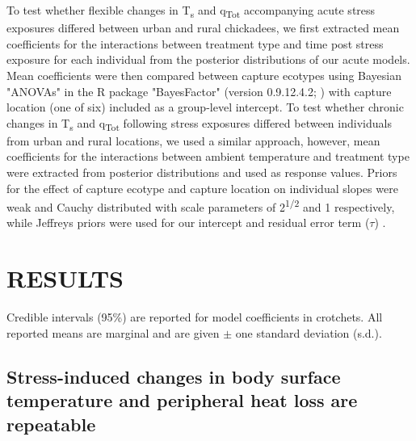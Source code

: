 \documentclass[12pt]{article}
\begin{document}
\noindent To test whether flexible changes in T\textsubscript{s} and q\textsubscript{Tot} accompanying acute stress exposures differed between urban and rural chickadees, we first extracted mean coefficients for the interactions between treatment type and time post stress exposure for each individual from the posterior distributions of our acute models. Mean coefficients were then compared between capture ecotypes using Bayesian "ANOVAs" in the R package "BayesFactor" (version 0.9.12.4.2; \citealt{morey_2019}) with capture location (one of six) included as a group-level intercept. To test whether chronic changes in T\textsubscript{s} and q\textsubscript{Tot} following stress exposures differed between individuals from urban and rural locations, we used a similar approach, however, mean coefficients for the interactions between ambient temperature and treatment type were extracted from posterior distributions and used as response values. Priors for the effect of capture ecotype and capture location on individual slopes were weak and Cauchy distributed with scale parameters of 2\textsuperscript{1/2} and 1 respectively, while Jeffreys priors were used for our intercept and residual error term ($\tau$) \citep{rouder_2012}.\vspace{0.5cm}

\section{RESULTS}
\vspace{0.5cm}

\noindent Credible intervals (95\%) are reported for model coefficients in crotchets. All reported means are marginal and are given $\pm$ one standard deviation (s.d.).
\vspace{0.5cm}

\subsection{Stress-induced changes in body surface temperature and peripheral heat loss are repeatable}
\vspace{0.5cm}
\end{document}
